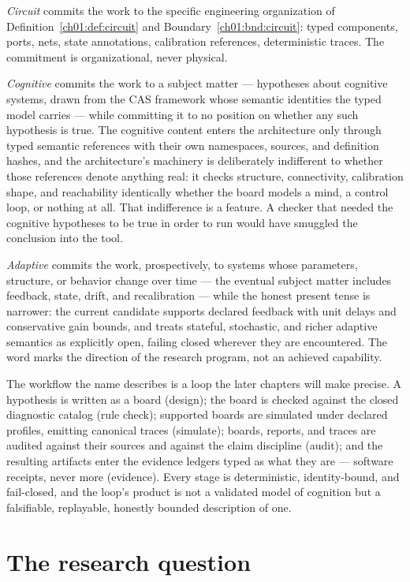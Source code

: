 \emph{Circuit} commits the work to the specific engineering organization of
Definition~\ref{ch01:def:circuit} and Boundary~\ref{ch01:bnd:circuit}: typed
components, ports, nets, state annotations, calibration references,
deterministic traces. The commitment is organizational, never physical.

\emph{Cognitive} commits the work to a subject matter --- hypotheses about
cognitive systems, drawn from the CAS framework whose semantic identities
the typed model carries --- while committing it to no position on whether
any such hypothesis is true. The cognitive content enters the architecture
only through typed semantic references with their own namespaces, sources,
and definition hashes, and the architecture's machinery is deliberately
indifferent to whether those references denote anything real: it checks
structure, connectivity, calibration shape, and reachability identically
whether the board models a mind, a control loop, or nothing at all. That
indifference is a feature. A checker that needed the cognitive hypotheses
to be true in order to run would have smuggled the conclusion into the
tool.

\emph{Adaptive} commits the work, prospectively, to systems whose
parameters, structure, or behavior change over time --- the eventual
subject matter includes feedback, state, drift, and recalibration --- while
the honest present tense is narrower: the current candidate supports
declared feedback with unit delays and conservative gain bounds, and
treats stateful, stochastic, and richer adaptive semantics as explicitly
open, failing closed wherever they are encountered. The word marks the
direction of the research program, not an achieved capability.

The workflow the name describes is a loop the later chapters will make
precise. A hypothesis is written as a board (design); the board is checked
against the closed diagnostic catalog (rule check); supported boards are
simulated under declared profiles, emitting canonical traces (simulate);
boards, reports, and traces are audited against their sources and against
the claim discipline (audit); and the resulting artifacts enter the
evidence ledgers typed as what they are --- software receipts, never more
(evidence). Every stage is deterministic, identity-bound, and fail-closed,
and the loop's product is not a validated model of cognition but a
falsifiable, replayable, honestly bounded description of one.

\section{The research question}\label{ch01:question}

